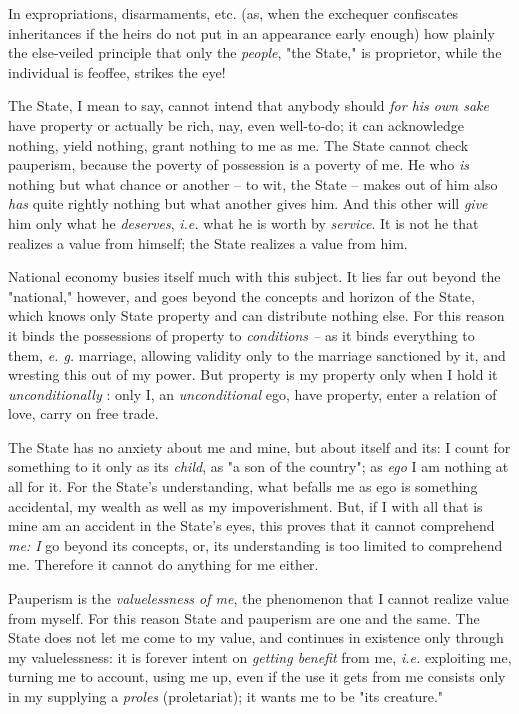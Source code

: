 In expropriations, disarmaments, etc. (as, when the exchequer confiscates 
inheritances if the heirs do not put in an appearance early enough) how 
plainly the else-veiled principle that only the \textit{people}, "{}the 
State,"{} is proprietor, while the individual is feoffee, strikes the eye!

The State, I mean to say, cannot intend that anybody should \textit{for his 
own sake} have property or actually be rich, nay, even well-to-do; it can 
acknowledge nothing, yield nothing, grant nothing to me as me. The State 
cannot check pauperism, because the poverty of possession is a poverty of me. 
He who \textit{is} nothing but what chance or another -- to wit, the State -- 
makes out of him also \textit{has} quite rightly nothing but what another 
gives him. And this other will \textit{give} him only what he 
\textit{deserves}, \textit{i.e.} what he is worth by \textit{service}. It is 
not he that realizes a value from himself; the State realizes a value from 
him.

National economy busies itself much with this subject. It lies far out beyond 
the "{}national,"{} however, and goes beyond the concepts and horizon of the 
State, which knows only State property and can distribute nothing else. For 
this reason it binds the possessions of property to \textit{conditions --} as 
it binds everything to them, \textit{e. g.} marriage, allowing validity only 
to the marriage sanctioned by it, and wresting this out of my power. But 
property is my property only when I hold it \textit{unconditionally} : only I, 
an \textit{unconditional} ego, have property, enter a relation of love, carry 
on free trade.

The State has no anxiety about me and mine, but about itself and its: I count 
for something to it only as its \textit{child}, as "{}a son of the country"{}; 
as \textit{ego} I am nothing at all for it. For the State's understanding, 
what befalls me as ego is something accidental, my wealth as well as my 
impoverishment. But, if I with all that is mine am an accident in the State's 
eyes, this proves that it cannot comprehend \textit{me: I} go beyond its 
concepts, or, its understanding is too limited to comprehend me. Therefore it 
cannot do anything for me either.

Pauperism is the \textit{valuelessness of me}, the phenomenon that I cannot 
realize value from myself. For this reason State and pauperism are one and the 
same. The State does not let me come to my value, and continues in existence 
only through my valuelessness: it is forever intent on \textit{getting 
benefit} from me, \textit{i.e.} exploiting me, turning me to account, using me 
up, even if the use it gets from me consists only in my supplying a 
\textit{proles} (proletariat); it wants me to be "{}its creature."{}

